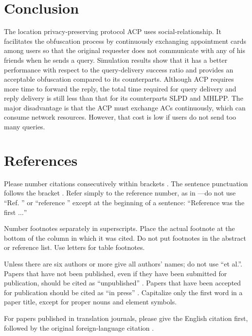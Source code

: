 \documentclass[conference]{IEEEtran}
\begin{document}
\section*{Conclusion}

The location privacy-preserving protocol ACP uses social-relationship. It facilitates the obfuscation process by continuously exchanging appointment cards among users so that the original requester does not communicate with any of his friends when he sends a query. Simulation results show that it has a better performance with respect to the query-delivery success ratio and provides an acceptable obfuscation compared to its counterparts. Although ACP requires more time to forward the reply, the total time required for query delivery and reply delivery is still less than that for its counterparts SLPD and MHLPP. The major disadvantage is that the ACP must exchange ACs continuously, which can consume network resources. However, that cost is low if users do not send too many queries.

\section*{References}

Please number citations consecutively within brackets \cite{b1}. The 
sentence punctuation follows the bracket \cite{b2}. Refer simply to the reference 
number, as in \cite{b3}---do not use ``Ref. \cite{b3}'' or ``reference \cite{b3}'' except at 
the beginning of a sentence: ``Reference \cite{b3} was the first $\ldots$''

Number footnotes separately in superscripts. Place the actual footnote at 
the bottom of the column in which it was cited. Do not put footnotes in the 
abstract or reference list. Use letters for table footnotes.

Unless there are six authors or more give all authors' names; do not use 
``et al.''. Papers that have not been published, even if they have been 
submitted for publication, should be cited as ``unpublished'' \cite{b4}. Papers 
that have been accepted for publication should be cited as ``in press'' \cite{b5}. 
Capitalize only the first word in a paper title, except for proper nouns and 
element symbols.

For papers published in translation journals, please give the English 
citation first, followed by the original foreign-language citation \cite{b6}.
\end{document}
